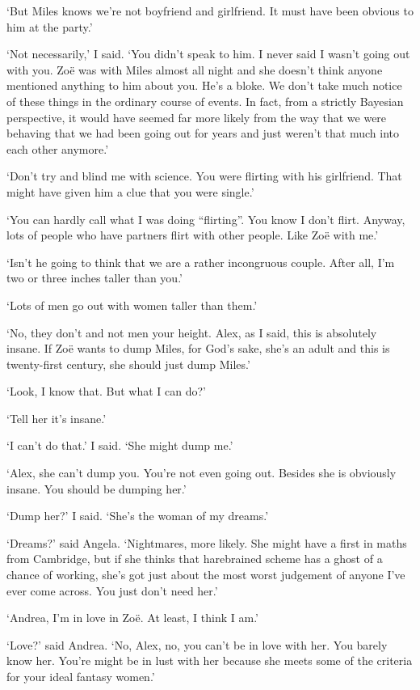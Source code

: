 `But Miles knows we're not boyfriend and girlfriend. It must have
been obvious to him at the party.'

`Not necessarily,' I said. `You didn't speak to him. I never said I
wasn't going out with you. Zo{\"e} was with Miles almost all night
and she doesn't think anyone mentioned anything to him about you.
He's a bloke. We don't take much notice of these things in the
ordinary course of events. In fact, from a strictly Bayesian
perspective, it would have seemed far more likely from the way that
we were behaving that we had been going out for years and just
weren't that much into each other anymore.'

`Don't try and blind me with science. You were flirting with his
girlfriend. That might have given him a clue that you were single.'

`You can hardly call what I was doing ``flirting''. You know I don't
flirt. Anyway, lots of people who have partners flirt with other
people. Like Zo{\"e} with me.'

`Isn't he going to think that we are a rather incongruous couple.
After all, I'm two or three inches taller than you.'

`Lots of men go out with women taller than them.'

`No, they don't and not men your height. Alex, as I said, this is
absolutely insane. If Zo{\"e} wants to dump Miles, for God's sake,
she's an adult and this is twenty-first century, she should just
dump Miles.'

`Look, I know that. But what I can do?'

`Tell her it's insane.'

`I can't do that.' I said. `She might dump me.'

`Alex, she can't dump you. You're not even going out. Besides she is
obviously insane. You should be dumping her.'

`Dump her?' I said. `She's the woman of my dreams.'

`Dreams?' said Angela. `Nightmares, more likely. She might have a
first in maths from Cambridge, but if she thinks that harebrained
scheme has a ghost of a chance of working, she's got just about the
most worst judgement of anyone I've ever come across. You just don't
need her.'

`Andrea, I'm in love in Zo{\"e}. At least, I think I am.'

`Love?' said Andrea. `No, Alex, no, you can't be in love with her.
You barely know her. You're might be in lust with her because she
meets some of the criteria for your ideal fantasy women.'

